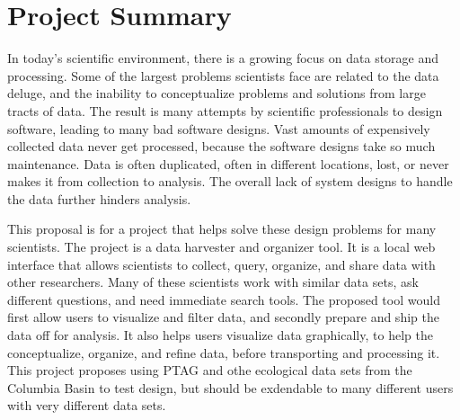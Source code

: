 

 


\section{Project Summary}
In today's scientific environment, there is a growing focus on data storage and
processing. Some of the largest problems scientists face are related to the data
deluge, and the inability to conceptualize problems and solutions from large
tracts of data. The result is many attempts by scientific professionals to 
design software, leading to many bad software designs. Vast amounts of 
expensively collected data never get processed, 
because the software designs take so much maintenance. Data is often duplicated,
often in different locations, lost, or never makes it from collection to 
analysis. The overall lack of system designs to handle the data further 
hinders analysis.

This proposal is for a project that helps solve these design problems for 
many scientists. The project is a data harvester and organizer tool. It
is a local web interface that allows scientists to collect, query, organize, 
and share data with other researchers.
Many of these scientists work with similar data sets, ask different 
questions, and need immediate search tools. The proposed tool would first allow 
users to visualize and filter data, and secondly prepare and ship the data
off for analysis. It also helps users visualize data graphically, to 
help the conceptualize, organize, and refine data, before transporting and 
processing it. This 
project proposes using PTAG and othe ecological data sets from the Columbia 
Basin to test design, but should be exdendable to many different users with very
different data sets.

